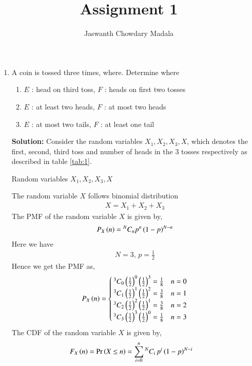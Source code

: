 \documentclass[journal,12pt,twocolumn]{IEEEtran}
\begin{document}
\vspace{3cm}


\title{Assignment 1}
\author{Jaswanth Chowdary Madala}





\maketitle

\newpage


\bigskip

\renewcommand{\thefigure}{\theenumi}
\renewcommand{\thetable}{\theenumi}



\begin{enumerate}
\item A coin is tossed three times, where. Determine  where
\begin{enumerate}
\item $E$ : head on third toss, $F$ : heads on first two tosses
\item $E$ : at least two heads, $F$ : at most two heads
\item $E$ : at most two tails, $F$ : at least one tail
\end{enumerate}
\textbf{Solution:} Consider the random variables $X_1, X_2, X_3,X$, which denotes the first, second, third toss and number of heads in the 3 tosses respectively as described in table \ref{tab:1}.
\begin{table}[h]
\centering

\caption{Random variables $X_1, X_2, X_3, X$}
\label{tab:1}
\end{table}

The random variable $X$ follows binomial distribution
\begin{align}
X = X_1 + X_2 + X_3
\end{align}
The PMF of the random variable $X$ is given by,
\begin{align}
P_{X}\left(n\right) = {^{N}C_{n}} {p}^{n} \left(1-p\right)^{N-n}
\end{align}
Here we have
\begin{align}
N = 3, \, p = \frac{1}{2}
\end{align}
Hence we get the PMF as,
\begin{align}
P_{X}\left(n\right) = 
\begin{cases}
{^{3}C_{0} \ensuremath{\left(\frac{1}{2}\right)}^0 \ensuremath{\left(\frac{1}{2}\right)}^3} = \frac{1}{8} & n = 0 \\
{^{3}C_{1} \left(\frac{1}{2}\right)^1 \left(\frac{1}{2}\right)^2} = \frac{3}{8} & n = 1 \\
{^{3}C_{2} \left(\frac{1}{2}\right)^2 \left(\frac{1}{2}\right)^1} = \frac{3}{8} & n = 2 \\
{^{3}C_{3} \left(\frac{1}{2}\right)^3 \left(\frac{1}{2}\right)^0} = \frac{1}{8} & n = 3 
\end{cases}
\end{align}
The CDF of the random variable $X$ is given by,
\begin{align}
F_{X}\left(n\right) = 	\Pr\left(X \le n\right) \label{eq:2}
&= \sum_{i = 0}^{n} {^{N}C_{i}}\, {p}^{i} \left(1-p\right)^{N-i}
\end{align}


\end{enumerate}
\end{document}
